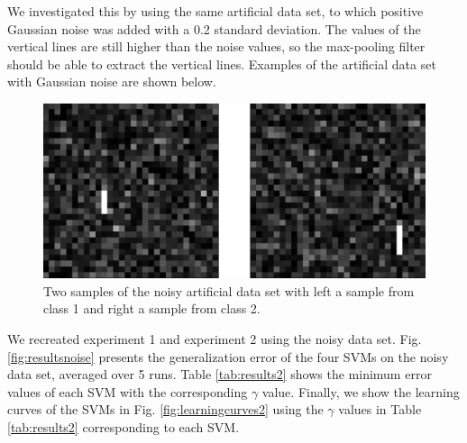 \documentclass[10pt,twocolumn,letterpaper]{article}
\begin{document}
We investigated this by using the same artificial data set, to which positive Gaussian noise was added with a 0.2 standard deviation.
The values of the vertical lines are still higher than the noise values, so the max-pooling filter should be able to extract the vertical lines. 
Examples of the artificial data set with Gaussian noise are shown below. 


\begin{figure}[h!]
\begin{center}
\includegraphics[draft=false, width=0.95\columnwidth]{images/noise_lines.png}
\end{center}
\caption{Two samples of the noisy artificial data set with left a sample from class 1 and right a sample from class 2.}
\label{lines}
\end{figure}


\noindent

We recreated experiment 1 and experiment 2 using the noisy data set. 
Fig. \ref{fig:resultsnoise} presents the generalization error of the four SVMs on the noisy data set, averaged over 5 runs. 
Table \ref{tab:results2} shows the minimum error values of each SVM with the corresponding $\gamma$ value. 
Finally, we show the learning curves of the SVMs in Fig. \ref{fig:learningcurves2} using the $\gamma$ values in Table \ref{tab:results2} corresponding to each SVM.
\end{document}
